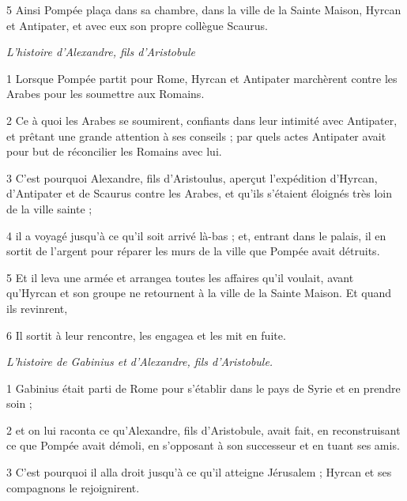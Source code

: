 \par 5 Ainsi Pompée plaça dans sa chambre, dans la ville de la Sainte Maison, Hyrcan et Antipater, et avec eux son propre collègue Scaurus.


\par \textit{L'histoire d'Alexandre, fils d'Aristobule}

\par 1 Lorsque Pompée partit pour Rome, Hyrcan et Antipater marchèrent contre les Arabes pour les soumettre aux Romains.

\par 2 Ce à quoi les Arabes se soumirent, confiants dans leur intimité avec Antipater, et prêtant une grande attention à ses conseils ; par quels actes Antipater avait pour but de réconcilier les Romains avec lui.

\par 3 C'est pourquoi Alexandre, fils d'Aristoulus, aperçut l'expédition d'Hyrcan, d'Antipater et de Scaurus contre les Arabes, et qu'ils s'étaient éloignés très loin de la ville sainte ;

\par 4 il a voyagé jusqu'à ce qu'il soit arrivé là-bas ; et, entrant dans le palais, il en sortit de l'argent pour réparer les murs de la ville que Pompée avait détruits.

\par 5 Et il leva une armée et arrangea toutes les affaires qu'il voulait, avant qu'Hyrcan et son groupe ne retournent à la ville de la Sainte Maison. Et quand ils revinrent,

\par 6 Il sortit à leur rencontre, les engagea et les mit en fuite.



\par \textit{L'histoire de Gabinius et d'Alexandre, fils d'Aristobule.}

\par 1 Gabinius était parti de Rome pour s'établir dans le pays de Syrie et en prendre soin ;

\par 2 et on lui raconta ce qu'Alexandre, fils d'Aristobule, avait fait, en reconstruisant ce que Pompée avait démoli, en s'opposant à son successeur et en tuant ses amis.

\par 3 C'est pourquoi il alla droit jusqu'à ce qu'il atteigne Jérusalem ; Hyrcan et ses compagnons le rejoignirent.

